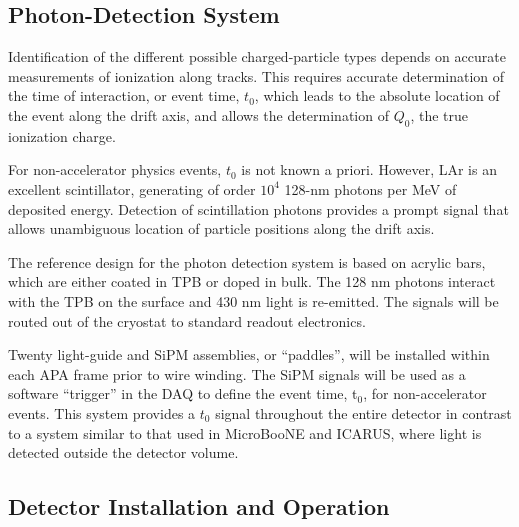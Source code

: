 
\subsection{Photon-Detection System}

Identification of the different possible charged-particle types 
depends on accurate measurements of ionization along tracks. This requires accurate determination
of the time of interaction, or event time, $t_0$, which leads to the absolute location 
of the event along the drift axis, and allows the determination of $Q_0$,  the 
true ionization charge.

For non-accelerator physics events, $t_0$ is not known a priori.  
However, LAr is an excellent scintillator, generating of 
order $10^{4}$ 128-nm photons per MeV of deposited energy.  
Detection of scintillation photons 
provides a prompt signal that allows unambiguous 
location of particle positions along the drift axis.

The reference design for the photon detection system is based on acrylic bars, which are either coated in TPB or doped in bulk. The 128 nm photons interact with the TPB on the surface and 430 nm light is re-emitted. 
The signals will be routed out of the cryostat to standard readout electronics.

Twenty light-guide and SiPM assemblies, or ``paddles'', will be installed within each APA frame prior to wire winding. The SiPM signals will be used as a software ``trigger'' in the DAQ to define the event time, t$_0$, for non-accelerator events. This system provides a $t_0$ signal throughout the entire detector in contrast to a system similar to that used in MicroBooNE and ICARUS, where light is detected outside the detector volume. 


\subsection{Detector Installation and Operation}
\label{sec:det-install}

